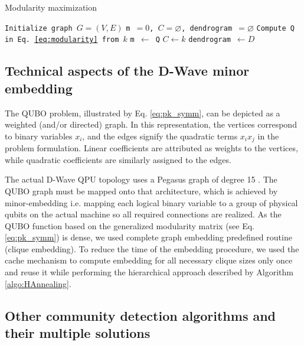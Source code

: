 \documentclass[pdflatex,sn-mathphys-num]{sn-jnl}%
\begin{document}
\begin{algorithm} 
    \caption{Modularity maximization}
    \label{algo:HAnnealing_maximization}
    \begin{algorithmic}[1]
        \State \texttt{Initialize graph $G=(V,E)$} 
        \State \texttt{m $= 0$, $C=\varnothing$, dendrogram $=\varnothing$} 
            \State {}
            \State \texttt{Compute Q in Eq. \ref{eq:modularity} from $k$}
                \State \texttt{m $\leftarrow$ Q}
                \State \texttt{$C \leftarrow k$}
                \State \texttt{dendrogram $ \leftarrow D$}
            \EndIf
        \EndFor        
    \end{algorithmic} 
\end{algorithm} 

\subsection*{Technical aspects of the D-Wave minor embedding}

The QUBO problem, illustrated by Eq. \ref{eq:pk_symm}, can be depicted as a weighted (and/or directed) graph. In this representation, the vertices correspond to binary variables $x_i$, and the edges signify the quadratic terms $x_ix_j$ in the problem formulation. Linear coefficients are attributed as weights to the vertices, while quadratic coefficients are similarly assigned to the edges.

The actual D-Wave QPU topology uses a Pegasus graph of degree 15 \cite{dattani_pegasus_2019}. The QUBO graph must be mapped onto that architecture, which is achieved by minor-embedding \cite{choi_minor-embedding_2011} i.e. mapping each logical binary variable to a group of physical qubits on the actual machine so all required connections are realized. As the QUBO function based on the generalized modularity matrix (see Eq. \ref{eq:pk_symm})  is dense, we used complete graph embedding predefined routine (clique embedding). To reduce the time of the embedding procedure, we used the cache mechanism to compute embedding for all necessary clique sizes only once and reuse it while performing the hierarchical approach described by Algorithm \ref{algo:HAnnealing}.

\subsection*{Other community detection algorithms and their multiple solutions}
\end{document}
